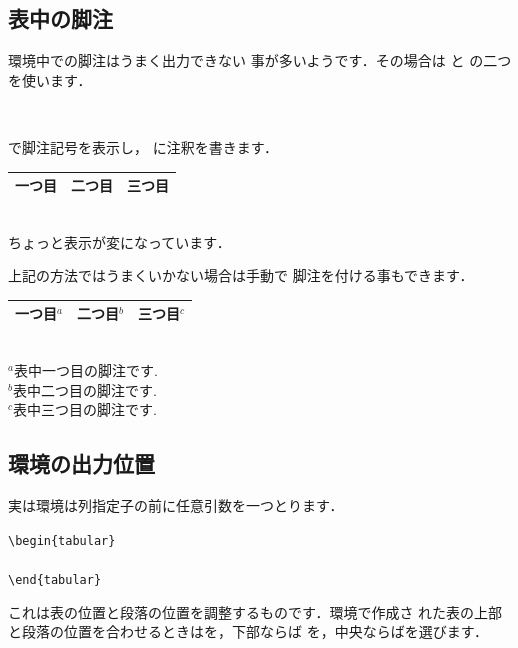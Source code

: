 \subsection{表中の脚注}
環境中での脚注はうまく出力できない
事が多いようです．その場合は 
と の二つを使います．
%
\begin{Syntax}
\\
\end{Syntax}
で脚注記号を表示し，
に注釈を書きます．
\begin{InOut}
\begin{tabular}{|c|c|c|} \hline 
  一つ目\footnotemark[1] & 
  二つ目\footnotemark[2] & 
  三つ目\footnotemark[3]\\ \hline
\end{tabular} 
\\ちょっと表示が変になっています．
\end{InOut}
上記の方法ではうまくいかない場合は手動で
脚注を付ける事もできます．
\begin{InOut}
\begin{tabular}{|c|c|c|}\hline 
  一つ目${}^{a}$ & 二つ目${}^{b}$ & 
  三つ目${}^{c}$ \\ \hline
\end{tabular} 
{\footnotesize \\ 
$^{a}$表中一つ目の脚注です.\\ 
$^{b}$表中二つ目の脚注です.\\ 
$^{c}$表中三つ目の脚注です.}
\end{InOut}


\subsection{環境の出力位置}

実は環境は列指定子の前に任意引数を一つとります．
\begin{Syntax}
\verb|\begin{tabular}|\\
\\
\verb|\end{tabular}|
\end{Syntax}
これは表の位置と段落の位置を調整するものです．環境で作成さ
れた表の上部と段落の位置を合わせるときはを，下部ならば
を，中央ならばを選びます．

